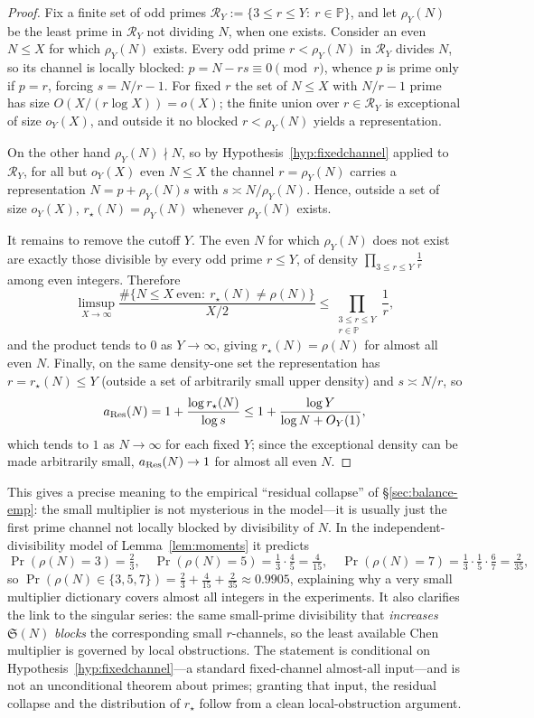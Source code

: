 \documentclass[]{interact}%
\newcommand{\PP}{\mathbb P}
\newcommand{\sing}{\mathfrak S}
\begin{document}
\begin{proof}
Fix a finite set of odd primes $\mathcal R_Y:=\{3\le r\le Y:\ r\in\PP\}$, and let $\rho_Y(N)$
be the least prime in $\mathcal R_Y$ not dividing $N$, when one exists. Consider an even
$N\le X$ for which $\rho_Y(N)$ exists. Every odd prime $r<\rho_Y(N)$ in $\mathcal R_Y$ divides
$N$, so its channel is locally blocked: $p=N-rs\equiv0\pmod r$, whence $p$ is prime only if
$p=r$, forcing $s=N/r-1$. For fixed $r$ the set of $N\le X$ with $N/r-1$ prime has size
$O(X/(r\log X))=o(X)$; the finite union over $r\in\mathcal R_Y$ is exceptional of size
$o_Y(X)$, and outside it no blocked $r<\rho_Y(N)$ yields a representation.

On the other hand $\rho_Y(N)\nmid N$, so by Hypothesis~\ref{hyp:fixedchannel} applied to
$\mathcal R_Y$, for all but $o_Y(X)$ even $N\le X$ the channel $r=\rho_Y(N)$ carries a
representation $N=p+\rho_Y(N)s$ with $s\asymp N/\rho_Y(N)$. Hence, outside a set of size
$o_Y(X)$, $r_\star(N)=\rho_Y(N)$ whenever $\rho_Y(N)$ exists.

It remains to remove the cutoff $Y$. The even $N$ for which $\rho_Y(N)$ does not exist are
exactly those divisible by every odd prime $r\le Y$, of density
$\prod_{3\le r\le Y}\tfrac1r$ among even integers. Therefore
\[
  \limsup_{X\to\infty}\frac{\#\{N\le X\ \mathrm{even}:\ r_\star(N)\ne\rho(N)\}}{X/2}
  \le\prod_{\substack{3\le r\le Y\\ r\in\PP}}\frac1r ,
\]
and the product tends to $0$ as $Y\to\infty$, giving $r_\star(N)=\rho(N)$ for almost all even
$N$. Finally, on the same density-one set the representation has $r=r_\star(N)\le Y$ (outside
a set of arbitrarily small upper density) and $s\asymp N/r$, so
\[
  a_{\rm Res}(N)=1+\frac{\log r_\star(N)}{\log s}\le1+\frac{\log Y}{\log N+O_Y(1)} ,
\]
which tends to $1$ as $N\to\infty$ for each fixed $Y$; since the exceptional density can be
made arbitrarily small, $a_{\rm Res}(N)\to1$ for almost all even $N$.
\end{proof}

This gives a precise meaning to the empirical ``residual collapse'' of
\S\ref{sec:balance-emp}: the small multiplier is not mysterious in the model---it is usually
just the first prime channel not locally blocked by divisibility of $N$. In the
independent-divisibility model of Lemma~\ref{lem:moments} it predicts
\[
  \Pr(\rho(N)=3)=\tfrac23,\quad
  \Pr(\rho(N)=5)=\tfrac13\!\cdot\!\tfrac45=\tfrac4{15},\quad
  \Pr(\rho(N)=7)=\tfrac13\!\cdot\!\tfrac15\!\cdot\!\tfrac67=\tfrac2{35},
\]
so $\Pr(\rho(N)\in\{3,5,7\})=\tfrac23+\tfrac4{15}+\tfrac2{35}\approx0.9905$, explaining why a
very small multiplier dictionary covers almost all integers in the experiments. It also
clarifies the link to the singular series: the same small-prime divisibility that
\emph{increases} $\sing(N)$ \emph{blocks} the corresponding small $r$-channels, so the least
available Chen multiplier is governed by local obstructions. The statement is conditional on
Hypothesis~\ref{hyp:fixedchannel}---a standard fixed-channel almost-all input---and is not an
unconditional theorem about primes; granting that input, the residual collapse and the
distribution of $r_\star$ follow from a clean local-obstruction argument.
\end{document}
